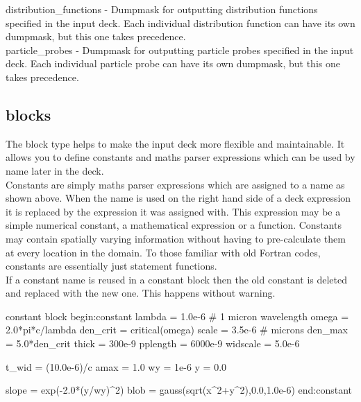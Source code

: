 {\emphtext distribution\_functions} - Dumpmask for outputting distribution
functions specified in the input deck. Each individual distribution function
can have its own dumpmask, but this one takes precedence.\\

{\emphtext particle\_probes} - Dumpmask for outputting particle probes
specified in the input deck. Each individual particle probe
can have its own dumpmask, but this one takes precedence.\\


\subsection{ blocks}

The  block type helps to make the input deck more flexible
and maintainable. It allows you to define constants and maths parser
expressions which can be used by name later in the deck.\\

Constants are simply maths parser expressions which are assigned to a name as
shown above. When the name is used on the right hand side of a deck expression
it is replaced by the expression it was assigned with. This expression may
be a simple numerical constant, a mathematical expression or a function.
Constants may contain spatially varying information without having to
pre-calculate them at every location in the domain.
To those familiar with old Fortran codes, constants are essentially just
statement functions.\\

If a constant name is reused in a constant block then the old constant is
deleted and replaced with the new one. This happens without warning.\\

\begin{lboxverbatim}{constant block}
begin:constant
   lambda = 1.0e-6 # 1 micron wavelength
   omega = 2.0*pi*c/lambda
   den_crit = critical(omega)
   scale = 3.5e-6 # microns
   den_max = 5.0*den_crit
   thick = 300e-9
   pplength = 6000e-9
   widscale = 5.0e-6

   t_wid = (10.0e-6)/c
   amax = 1.0
   wy = 1e-6
   y = 0.0

   slope = exp(-2.0*(y/wy)^2)
   blob = gauss(sqrt(x^2+y^2),0.0,1.0e-6)
end:constant
\end{lboxverbatim}

